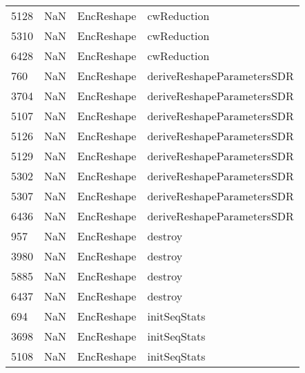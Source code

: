 \begin{tabular}{llll}
5128 &                   NaN &                 EncReshape &                               cwReduction \\
5310 &                   NaN &                 EncReshape &                               cwReduction \\
6428 &                   NaN &                 EncReshape &                               cwReduction \\
760  &                   NaN &                 EncReshape &                deriveReshapeParametersSDR \\
3704 &                   NaN &                 EncReshape &                deriveReshapeParametersSDR \\
5107 &                   NaN &                 EncReshape &                deriveReshapeParametersSDR \\
5126 &                   NaN &                 EncReshape &                deriveReshapeParametersSDR \\
5129 &                   NaN &                 EncReshape &                deriveReshapeParametersSDR \\
5302 &                   NaN &                 EncReshape &                deriveReshapeParametersSDR \\
5307 &                   NaN &                 EncReshape &                deriveReshapeParametersSDR \\
6436 &                   NaN &                 EncReshape &                deriveReshapeParametersSDR \\
957  &                   NaN &                 EncReshape &                                   destroy \\
3980 &                   NaN &                 EncReshape &                                   destroy \\
5885 &                   NaN &                 EncReshape &                                   destroy \\
6437 &                   NaN &                 EncReshape &                                   destroy \\
694  &                   NaN &                 EncReshape &                              initSeqStats \\
3698 &                   NaN &                 EncReshape &                              initSeqStats \\
5108 &                   NaN &                 EncReshape &                              initSeqStats \\

\end{tabular}
